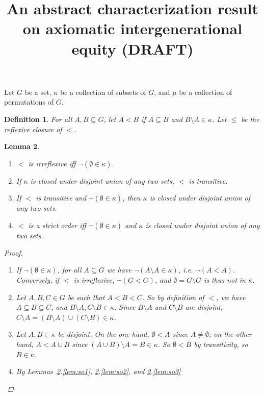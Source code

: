 \documentclass[11pt]{article}
\title{An abstract characterization result on axiomatic intergenerational equity (DRAFT)}
\newtheorem{definition}{Definition}
\newtheorem{lemma}[definition]{Lemma}
\begin{document}
\maketitle


Let $G$ be a set, $\kappa$ be a collection of subsets of $G$, and $\mu$ be a collection of permutations of $G$.


\begin{definition}
 For all $A,B \subseteq G$, let $A < B$ if $A \subseteq B$ and $B \setminus A \in \kappa$. Let $\leq$ be the reflexive closure of $<$.
\end{definition}



\begin{lemma}\label{lem:so}
\begin{enumerate}
 \item\label{lem:so1} $<$ is irreflexive iff $\neg(\emptyset \in \kappa)$.
 
 \item\label{lem:so2} If $\kappa$ is closed under disjoint union of any two sets, $<$ is transitive.
 
 \item\label{lem:so3} If $<$ is transitive and $\neg(\emptyset \in \kappa)$, then $\kappa$ is closed under disjoint union of any two sets.
 
 \item\label{lem:so4} $<$ is a strict order iff $\neg(\emptyset \in \kappa)$ and $\kappa$ is closed under disjoint union of any two sets.
\end{enumerate}

\begin{proof}
 \begin{enumerate}
  \item If $\neg(\emptyset \in \kappa)$, for all $A \subseteq G$ we have $\neg(A \setminus A \in \kappa)$, i.e. $\neg(A < A)$. Conversely, if $<$ is irreflexive, $\neg (G < G)$, and $\emptyset = G \setminus G$ is thus not in $\kappa$.
  
   
  \item Let $A,B,C \in G$ be such that $A < B < C$. So by definition of $<$, we have $A \subseteq B \subseteq C$, and $B \setminus A, C \setminus B \in \kappa$. Since $B \setminus A$ and $C \setminus B$ are disjoint, $C \setminus A = (B \setminus A) \cup (C \setminus B) \in \kappa$.
  
  \item Let $A,B \in \kappa$ be disjoint.  On the one hand, $\emptyset < A$ since $A \neq \emptyset$; on the other hand, $A < A \cup B$ since $(A \cup B) \setminus A = B \in \kappa$. So $\emptyset < B$ by transitivity, so $B \in \kappa$.
  
  \item By Lemmas~\ref{lem:so}.\ref{lem:so1}, \ref{lem:so}.\ref{lem:so2}, and \ref{lem:so}.\ref{lem:so3}
 \end{enumerate}
\end{proof}
\end{lemma}
\end{document}
